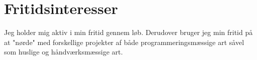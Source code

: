\documentclass[a4paper]{twentysecondcv} %
\begin{document}
\vfill
\section{Fritidsinteresser}

Jeg holder mig aktiv i min fritid gennem løb. Derudover bruger jeg min fritid på at "nørde" med forskellige projekter af både programmeringsmæssige art såvel som huslige og håndværksmæssige art.

\vfill

\end{document}

